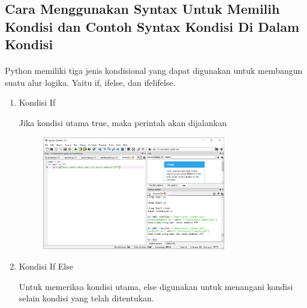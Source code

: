 \subsection{Cara Menggunakan Syntax Untuk Memilih Kondisi dan Contoh Syntax Kondisi Di Dalam Kondisi}
\paragraph{}
        Python memiliki tiga jenis kondisional yang dapat digunakan untuk membangun suatu alur logika. Yaitu if, ifelse, dan ifelifelse. 
\begin{enumerate}
    \item Kondisi If
    \par Jika kondisi utama true, maka perintah akan dijalankan
    \begin{figure}[h]
        \centerline{\includegraphics[width=8cm]{figures/kondisiif.PNG}}
    \end{figure}
    \item Kondisi If Else
    \par Untuk memeriksa kondisi utama, else digunakan untuk menangani kondisi selain kondisi yang telah ditentukan.

\end{enumerate}

